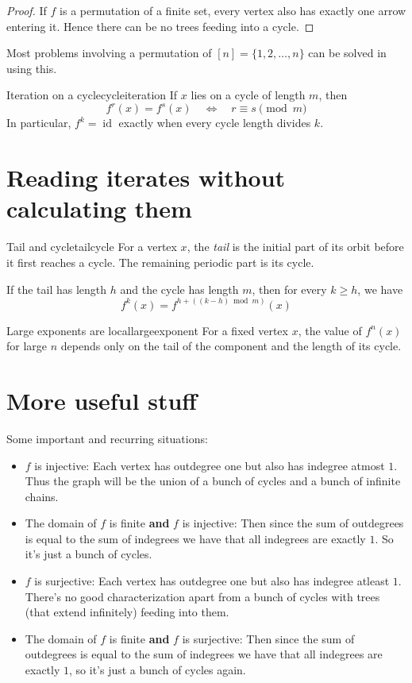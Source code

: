\documentclass[11pt]{scrartcl}
\newcommand{\id}{\operatorname{id}}
\begin{document}
\begin{proof}
  If \(f\) is a permutation of a finite set, every vertex 
  also has exactly one arrow entering it. Hence there can 
  be no trees feeding into a cycle.
\end{proof}
Most problems involving a permutation of \([n]=\{1, 2, \dots, n\}\) 
can be solved in using this.

\begin{claim}{Iteration on a cycle}{cycleiteration}
If \(x\) lies on a cycle of length \(m\), then \[f^r(x)=f^s(x)\quad\Longleftrightarrow\quad r\equiv s\pmod m\]
In particular, \(f^k=\id\) exactly when every cycle length divides \(k\).
\end{claim}


\section{Reading iterates without calculating them}

\begin{definition}{Tail and cycle}{tailcycle}
For a vertex \(x\), the \emph{tail} is the initial part of its orbit before it first reaches a cycle. The remaining periodic part is its cycle.
\end{definition}

If the tail has length \(h\) and the cycle has length \(m\), then for every \(k\ge h\), we have\[f^k(x)=f^{h+((k-h)\bmod m)}(x)\]


\begin{claim}{Large exponents are local}{largeexponent}
For a fixed vertex \(x\), the value of \(f^n(x)\) for large \(n\) depends only on the tail of the component and the length of its cycle.
\end{claim}

\section{More useful stuff}

Some important and recurring situations:

\begin{itemize}
  \item \(f\) is injective: Each vertex has outdegree one but
  also has indegree atmost \(1\). Thus the graph will be the union of 
  a bunch of cycles and a bunch of infinite chains.
  \item The domain of \(f\) is finite \textbf{and} \(f\) is injective: 
  Then since the sum of outdegrees is equal to the sum of indegrees 
  we have that all indegrees are exactly \(1\). So it's just a bunch 
  of cycles.
  \item \(f\) is surjective: Each vertex has outdegree one but also 
  has indegree atleast \(1\). There's no good characterization apart from 
  a bunch of cycles with trees (that extend infinitely) feeding into them. 
  \item The domain of \(f\) is finite \textbf{and} \(f\) is surjective: 
  Then since the sum of outdegrees is equal to the sum of indegrees 
  we have that all indegrees are exactly \(1\), so it's just a bunch of 
  cycles again. 
\end{itemize}
\end{document}
